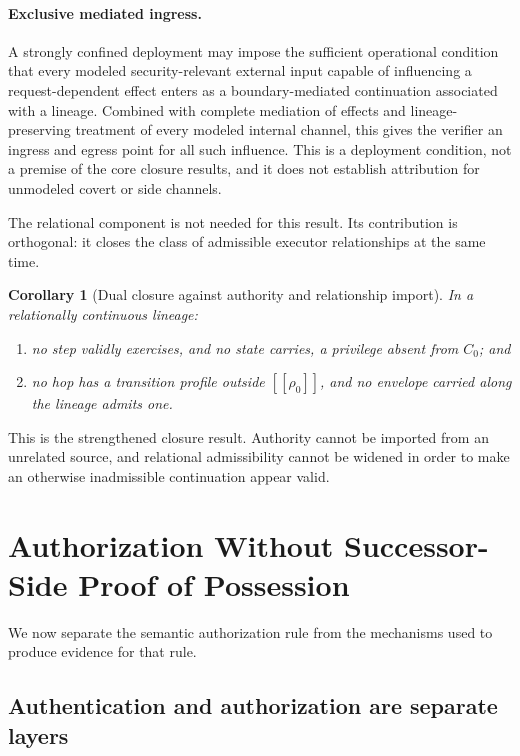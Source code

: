\documentclass[10pt,twocolumn]{article}
\newcommand{\sem}[1]{\left[\!\left[#1\right]\!\right]}
\newtheorem{corollary}{Corollary}
\begin{document}
\paragraph{Exclusive mediated ingress.}
A strongly confined deployment may impose the sufficient operational condition
that every modeled security-relevant external input capable of influencing a
request-dependent effect enters as a boundary-mediated continuation associated
with a lineage. Combined with complete mediation of effects and
lineage-preserving treatment of every modeled internal channel, this gives the
verifier an ingress and egress point for all such influence. This is a
deployment condition, not a premise of the core closure results, and it does not
establish attribution for unmodeled covert or side channels.

The relational component is not needed for this result. Its contribution is
orthogonal: it closes the class of admissible executor relationships at the
same time.

\begin{corollary}[Dual closure against authority and relationship import]
In a relationally continuous lineage:
\begin{enumerate}
    \item no step validly exercises, and no state carries, a privilege absent
    from \(C_0\); and
    \item no hop has a transition profile outside \(\sem{\rho_0}\), and no
    envelope carried along the lineage admits one.
\end{enumerate}
\end{corollary}

This is the strengthened closure result. Authority cannot be imported from an
unrelated source, and relational admissibility cannot be widened in order to
make an otherwise inadmissible continuation appear valid.

\section{Authorization Without Successor-Side Proof of Possession}

We now separate the semantic authorization rule from the mechanisms used to
produce evidence for that rule.

\subsection{Authentication and authorization are separate layers}
\end{document}
